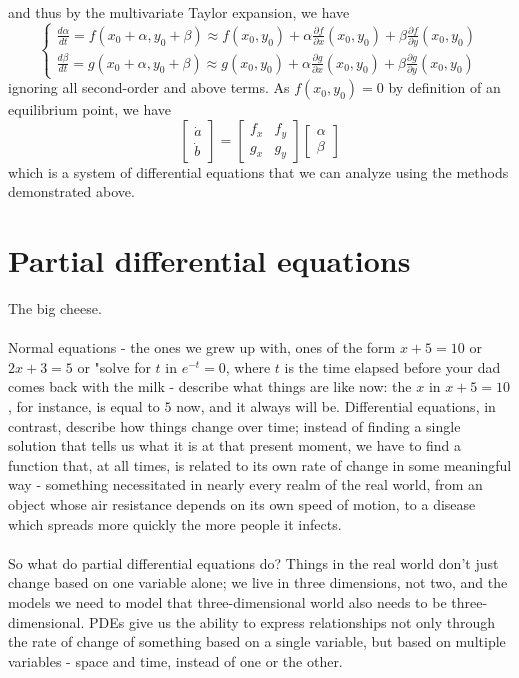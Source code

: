 \documentclass{article}
\begin{document}
and thus by the multivariate Taylor expansion, we have 
\begin{equation*}
    \begin{cases}
        \frac{d\alpha}{dt} =f(x_0+\alpha, y_0+\beta) \approx f(x_0,y_0)+\alpha \frac{\partial f}{\partial x}(x_0,y_0) + \beta\frac{\partial f}{\partial y}(x_0,y_0)\\
        \frac{d\beta}{dt} =g(x_0+\alpha, y_0+\beta) \approx g(x_0,y_0)+\alpha \frac{\partial g}{\partial x}(x_0,y_0) + \beta\frac{\partial g}{\partial y}(x_0,y_0)
    \end{cases}
\end{equation*}
ignoring all second-order and above terms. As $f(x_0,y_0)=0$ by definition of an equilibrium point, we have 
\begin{equation*}
    \begin{bmatrix}
        \dot{a} \\\dot{b}
    \end{bmatrix}=\begin{bmatrix}
        f_{x} & f_{y} \\
        g_{x} & g_{y}
    \end{bmatrix}\begin{bmatrix}
        \alpha \\ \beta
    \end{bmatrix}
\end{equation*}
which is a system of differential equations that we can analyze using the methods demonstrated above. 
\newpage
\section{Partial differential equations}
The big cheese.\\ \\
Normal equations - the ones we grew up with, ones of the form $x+5=10$ or $2x+3=5$ or "solve for $t$ in $e^{-t} = 0$, where $t$ is the time elapsed before your dad comes back with the milk - describe what things are like now: the $x$ in $x+5=10$, for instance, is equal to $5$ now, and it always will be. Differential equations, in contrast, describe how things change over time; instead of finding a single solution that tells us what it is at that present moment, we have to find a function that, at all times, is related to its own rate of change in some meaningful way - something necessitated in nearly every realm of the real world, from an object whose air resistance depends on its own speed of motion, to a disease which spreads more quickly the more people it infects. \\ \\
So what do partial differential equations do? Things in the real world don't just change based on one variable alone; we live in three dimensions, not two, and the models we need to model that three-dimensional world also needs to be three-dimensional. PDEs give us the ability to express relationships not only through the rate of change of something based on a single variable, but based on multiple variables - space and time, instead of one or the other. 
\end{document}
